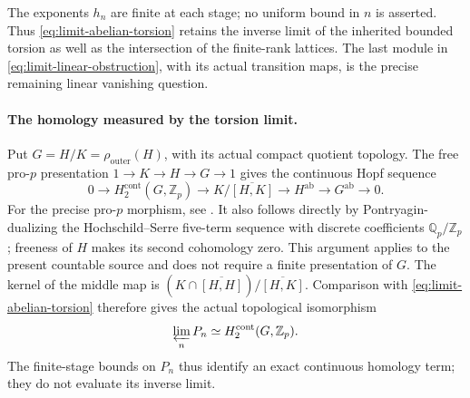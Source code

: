 The exponents \(h_n\) are finite at each stage; no uniform
bound in \(n\) is asserted. Thus
\eqref{eq:limit-abelian-torsion} retains the inverse limit
of the inherited bounded torsion as well as the intersection
of the finite-rank lattices. The last module in
\eqref{eq:limit-linear-obstruction}, with its actual
transition maps, is the precise remaining linear
vanishing question.

\paragraph{The homology measured by the torsion limit.}
Put \(G=H/K=\rho_{\mathrm{outer}}(H)\), with its actual compact
quotient topology. The free pro-\(p\) presentation
\(1\to K\to H\to G\to1\) gives the continuous Hopf sequence
\[
0\longrightarrow H_2^{\mathrm{cont}}(G,\mathbb Z_p)
\longrightarrow K/\overline{[H,K]}
\longrightarrow H^{\mathrm{ab}}
\longrightarrow G^{\mathrm{ab}}\longrightarrow0.
\]
For the precise pro-\(p\) morphism, see
\cite[Proposition~2.2, author p.~3, and the Hopf formula on
author p.~4]{Moravec2011}. It also follows directly by
Pontryagin-dualizing the Hochschild--Serre five-term sequence
with discrete coefficients \(\mathbb Q_p/\mathbb Z_p\);
freeness of \(H\) makes its second cohomology zero.
This argument applies to the present countable source and
does not require a finite presentation of \(G\).
The kernel of the middle map is
\((K\cap\overline{[H,H]})/\overline{[H,K]}\).
Comparison with \eqref{eq:limit-abelian-torsion} therefore gives
the actual topological isomorphism
\[
 \varprojlim_nP_n
       \simeq H_2^{\mathrm{cont}}(G,\mathbb Z_p).
\]
The finite-stage bounds on \(P_n\) thus identify an exact
continuous homology term; they do not evaluate its inverse
limit.

